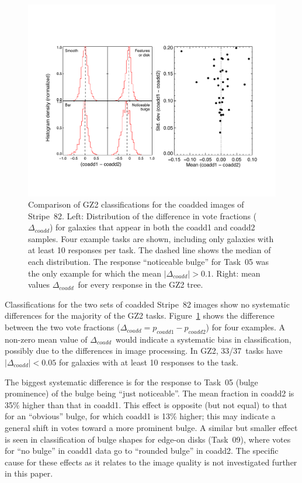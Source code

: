 \documentclass[useAMS,usenatbib]{mn2e}
\newcommand{\dcoadd}{$\Delta_{coadd}$}
\begin{document}
\begin{figure}
\includegraphics[angle=0,width=7.0in]{figures/stripe82_coadd_compare.pdf}
\caption{Comparison of GZ2 classifications for the coadded images of Stripe~82. Left: Distribution of the difference in vote fractions (\dcoadd) for galaxies that appear in both the coadd1 and coadd2 samples. Four example tasks are shown, including only galaxies with at least 10 responses per task. The dashed line shows the median of each distribution. The response ``noticeable bulge'' for Task~05 was the only example for which the mean $|\Delta_{coadd}| > 0.1$. Right: mean values \dcoadd~for every response in the GZ2 tree. 
\label{fig-stripe82_compare}}
\end{figure}

Classifications for the two sets of coadded Stripe~82 images show no systematic differences for the majority of the GZ2 tasks. Figure~\ref{fig-stripe82_compare} shows the difference between the two vote fractions ($\Delta_{coadd} = p_{coadd1} - p_{coadd2}$) for four examples. A non-zero mean value of \dcoadd~would indicate a systematic bias in classification, possibly due to the differences in image processing. In GZ2, 33/37~tasks have $|\Delta_{coadd}| < 0.05$ for galaxies with at least 10 responses to the task. 

The biggest systematic difference is for the response to Task~05 (bulge prominence) of the bulge being ``just noticeable''. The mean fraction in coadd2 is 35\% higher than that in coadd1. This effect is opposite (but not equal) to that for an ``obvious'' bulge, for which coadd1 is 13\% higher; this may indicate a general shift in votes toward a more prominent bulge. A similar but smaller effect is seen in classification of bulge shapes for edge-on disks (Task~09), where votes for ``no bulge'' in coadd1 data go to ``rounded bulge'' in coadd2. The specific cause for these effects as it relates to the image quality is not investigated further in this paper. 
\end{document}
